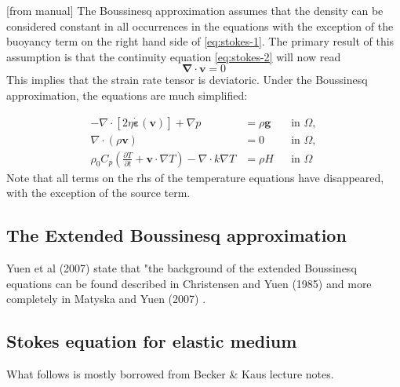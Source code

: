 [from \aspect{} manual]
The Boussinesq approximation assumes that the density can be
considered constant in all occurrences in the equations with the exception of
the buoyancy term on the right hand side of \eqref{eq:stokes-1}. The primary
result of this assumption is that the continuity equation \eqref{eq:stokes-2}
will now read
\[
{\bm \nabla}\cdot{\bm v} = 0
\]
This implies that the strain rate tensor is deviatoric.
Under the Boussinesq approximation, the equations are much simplified:

\begin{align}
  \label{eq:stokes-1}
  -\nabla \cdot \left[2\eta \dot{\bm \varepsilon}(\bm v)
                \right] + \nabla p &=
  \rho \bm g
  &
  & \textrm{in $\Omega$},
  \\
  \label{eq:stokes-2}
  \nabla \cdot (\rho \bm v) &= 0
  &
  & \textrm{in $\Omega$},
  \\
  \label{eq:temperature}
  \rho_0 C_p \left(\frac{\partial T}{\partial t} + \bm v\cdot\nabla T\right)
  - \nabla\cdot k\nabla T
  &=
  \rho H
  &
  & \textrm{in $\Omega$}
\end{align}
Note that all terms on the rhs of the temperature equations have disappeared, with the exception 
of the source term.


\subsection{The Extended Boussinesq approximation}


Yuen et al (2007) \cite{yumc07} state that "the background of the extended Boussinesq 
equations can be found described in 
Christensen and Yuen (1985) \cite{chyu85} and more completely in Matyska and Yuen (2007) \cite{mayu07}.

\Literature \cite{hayk91,hayk93}




\newpage
\subsection{Stokes equation for elastic medium}

What follows is mostly borrowed from Becker \& Kaus lecture notes.


